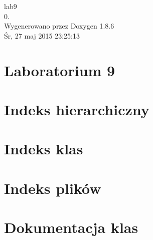 \documentclass[twoside]{book}
\newcommand{\clearemptydoublepage}{%
  \newpage{\pagestyle{empty}\cleardoublepage}%
}
\begin{document}
\hypersetup{pageanchor=false}
\begin{titlepage}
\vspace*{7cm}
\begin{center}%
{\Large lab9 \\[1ex]\large 0. }\\
\vspace*{1cm}
{\large Wygenerowano przez Doxygen 1.8.6}\\
\vspace*{0.5cm}
{\small Śr, 27 maj 2015 23:25:13}\\
\end{center}
\end{titlepage}
\clearemptydoublepage
\tableofcontents
\clearemptydoublepage
{}
\hypersetup{pageanchor=true}

\chapter{Laboratorium 9}
\label{index}\hypertarget{index}{}
\chapter{Indeks hierarchiczny}

\chapter{Indeks klas}

\chapter{Indeks plików}

\chapter{Dokumentacja klas}

























\end{document}
